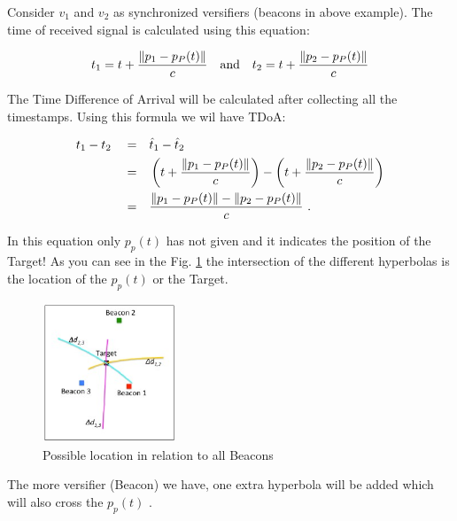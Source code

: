 Consider $v_1$ and $v_2$ as synchronized versifiers (beacons in above example). The time of received signal is calculated using this equation:

\begin{equation}
    \label{eqn:time_received_sig}
    t_1 = t + \frac{\norm{p_1-p_P(t)}}{c}
    \quad \text{and} \quad
    t_2 = t + \frac{\norm{p_2-p_P(t)}}{c}
\end{equation}

The Time Difference of Arrival will be calculated after collecting all the timestamps. Using this formula we wil have TDoA:

\begin{equation}
    \label{eqn:time_difference_arr}
    \begin{split}
        t_1 - t_2 \quad =& \quad \hat t_1 - \hat t_2 \\
        =& \quad \left(t+\frac{\norm{p_1-p_P(t)}}{c}\right) - \left(t+\frac{\norm{p_2-p_P(t)}}{c}\right)\\
        =& \quad \frac{\norm{p_1-p_P(t)} - \norm{p_2-p_P(t)}}{c} \ .
    \end{split}
\end{equation}

In this equation only $p_p(t)$ has not given and it indicates the position of the Target! As you can see in the Fig. \ref{fig:hyp_location} the intersection of the different hyperbolas is the location of the $p_p(t)$ or the Target. \cite{brian17}

\begin{figure}[htp]
    \centering
    \includegraphics[width=4cm]{8.jpg}
    \caption{Possible location in relation to all Beacons \cite{brian17}}
    \label{fig:hyp_location}
\end{figure}

The more versifier (Beacon) we have, one extra hyperbola will be added which will also cross the $p_p(t)$ \cite{schaefer18}.

